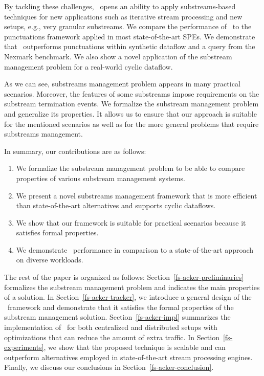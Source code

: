 By tackling these challenges, \tracker\ opens an ability to apply substreams-based techniques for new applications such as iterative stream processing and new setups, e.g., very granular substreams. We compare the performance of \tracker\ to the punctuations framework applied in most state-of-the-art SPEs. We demonstrate that \tracker\ outperforms punctuations within synthetic dataflow and a query from the Nexmark benchmark. We also show a novel application of the substream management problem for a real-world cyclic dataflow. 

As we can see, substreams management problem appears in many practical scenarios. Moreover, the features of some substreams impose requirements on the substream termination events. We formalize the substream management problem and generalize its properties. It allows us to ensure that our approach is suitable for the mentioned scenarios as well as for the more general problems that require substreams management.

In summary, our contributions are as follows:
\begin{enumerate}
    \item We formalize the substream management problem to be able to compare properties of various substream management systems.
    \item We present a novel substreams management framework that is more efficient than state-of-the-art alternatives and supports cyclic dataflows.
    \item We show that our framework is suitable for practical scenarios because it satisfies formal properties.
    \item We demonstrate \tracker\ performance in comparison to a state-of-the-art approach on diverse workloads.
\end{enumerate}

The rest of the paper is organized as follows: Section~\ref{fs-acker-preliminaries} formalizes the substream management problem and indicates the main properties of a solution. In Section~\ref{fs-acker-tracker}, we introduce a general design of the \tracker\ framework and demonstrate that it satisfies the formal properties of the substream management solution. Section~\ref{fs-acker-impl} summarizes the implementation of \tracker\ for both centralized and distributed setups with optimizations that can reduce the amount of extra traffic. In Section~\ref{fs-experiments}, we show that the proposed technique is scalable and can outperform alternatives employed in state-of-the-art stream processing engines. Finally, we discuss our conclusions in Section~\ref{fs-acker-conclusion}.